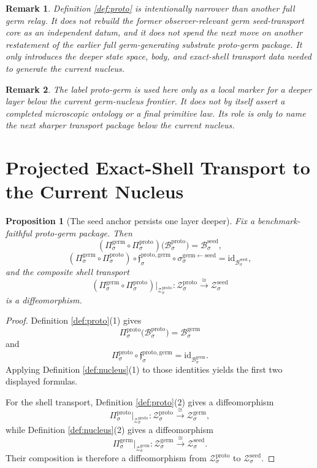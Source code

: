 \documentclass[11pt]{article}
\newcommand{\SeedBody}[1]{\mathcal B_{#1}^{\mathrm{seed}}}
\newcommand{\SeedShell}[1]{\mathcal Z_{#1}^{\mathrm{seed}}}
\newcommand{\GermBody}[1]{\mathcal B_{#1}^{\mathrm{germ}}}
\newcommand{\GermProj}[1]{\Pi_{#1}^{\mathrm{germ}}}
\newcommand{\GermSeedSec}[1]{\sigma_{#1}^{\mathrm{germ\leftarrow seed}}}
\newcommand{\GermShell}[1]{\mathcal Z_{#1}^{\mathrm{germ}}}
\newcommand{\ProtoBody}[1]{\mathcal B_{#1}^{\mathrm{proto}}}
\newcommand{\ProtoProj}[1]{\Pi_{#1}^{\mathrm{proto}}}
\newcommand{\ProtoGermMin}[1]{\mathfrak f_{#1}^{\mathrm{proto,germ}}}
\newcommand{\ProtoShell}[1]{\mathcal Z_{#1}^{\mathrm{proto}}}
\newtheorem{proposition}{Proposition}
\newtheorem{remark}{Remark}
\begin{document}
\begin{remark}
Definition \ref{def:proto} is intentionally narrower than another full germ relay. It does not rebuild the former observer-relevant germ seed-transport core as an independent datum, and it does not spend the next move on another restatement of the earlier full germ-generating substrate proto-germ package. It only introduces the deeper state space, body, and exact-shell transport data needed to generate the current nucleus.
\end{remark}

\begin{remark}
The label \emph{proto-germ} is used here only as a local marker for a deeper layer below the current germ-nucleus frontier. It does not by itself assert a completed microscopic ontology or a final primitive law. Its role is only to name the next sharper transport package below the current nucleus.
\end{remark}

\section{Projected Exact-Shell Transport to the Current Nucleus}

\begin{proposition}[The seed anchor persists one layer deeper]
\label{prop:anchor}
Fix a benchmark-faithful proto-germ package. Then
\[
(\GermProj{\sigma}\circ\ProtoProj{\sigma})\bigl(\ProtoBody{\sigma}\bigr)
=
\SeedBody{\sigma},
\]
\[
(\GermProj{\sigma}\circ\ProtoProj{\sigma})\circ
\ProtoGermMin{\sigma}\circ\GermSeedSec{\sigma}
=
\mathrm{id}_{\SeedBody{\sigma}},
\]
and the composite shell transport
\[
(\GermProj{\sigma}\circ\ProtoProj{\sigma})\big|_{\ProtoShell{\sigma}}
:
\ProtoShell{\sigma}
\xrightarrow{\cong}
\SeedShell{\sigma}
\]
is a diffeomorphism.
\end{proposition}

\begin{proof}
Definition \ref{def:proto}(1) gives
\[
\ProtoProj{\sigma}\bigl(\ProtoBody{\sigma}\bigr)=\GermBody{\sigma}
\]
and
\[
\ProtoProj{\sigma}\circ\ProtoGermMin{\sigma}
=
\mathrm{id}_{\GermBody{\sigma}}.
\]
Applying Definition \ref{def:nucleus}(1) to those identities yields the first two displayed formulas.

For the shell transport, Definition \ref{def:proto}(2) gives a diffeomorphism
\[
\ProtoProj{\sigma}\big|_{\ProtoShell{\sigma}}
:
\ProtoShell{\sigma}
\xrightarrow{\cong}
\GermShell{\sigma},
\]
while Definition \ref{def:nucleus}(2) gives a diffeomorphism
\[
\GermProj{\sigma}\big|_{\GermShell{\sigma}}
:
\GermShell{\sigma}
\xrightarrow{\cong}
\SeedShell{\sigma}.
\]
Their composition is therefore a diffeomorphism from \(\ProtoShell{\sigma}\) to \(\SeedShell{\sigma}\).
\end{proof}
\end{document}
